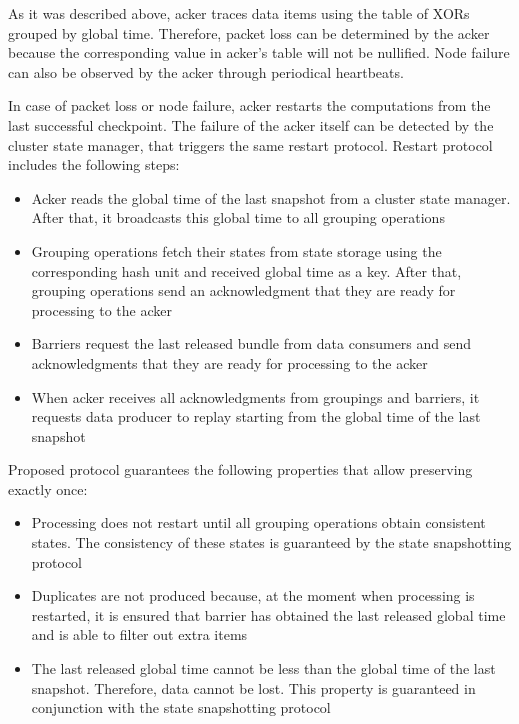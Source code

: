 As it was described above, acker traces data items using the table of XORs grouped by global time. Therefore, packet loss can be determined by the acker because the corresponding value in acker's table will not be nullified. Node failure can also be observed by the acker through periodical heartbeats. 

In case of packet loss or node failure, acker restarts the computations from the last successful checkpoint. The failure of the acker itself can be detected by the cluster state manager, that triggers the same restart protocol. Restart protocol includes the following steps:

\begin{itemize}
    \item Acker reads the global time of the last snapshot from a cluster state manager. After that, it broadcasts this global time to all grouping operations
    \item Grouping operations fetch their states from state storage using the corresponding hash unit and received global time as a key. After that, grouping operations send an acknowledgment that they are ready for processing to the acker 
    \item Barriers request the last released bundle from data consumers and send acknowledgments that they are ready for processing to the acker
    \item When acker receives all acknowledgments from groupings and barriers, it requests data producer to replay starting from the global time of the last snapshot  
\end{itemize}

Proposed protocol guarantees the following properties that allow preserving exactly once:

\begin{itemize}
    \item Processing does not restart until all grouping operations obtain consistent states. The consistency of these states is guaranteed by the state snapshotting protocol
    \item Duplicates are not produced because, at the moment when processing is restarted, it is ensured that barrier has obtained the last released global time and is able to filter out extra items
    \item The last released global time cannot be less than the global time of the last snapshot. Therefore, data cannot be lost. This property is guaranteed in conjunction with the state snapshotting protocol
\end{itemize}